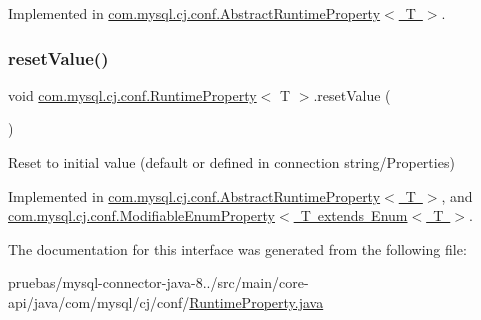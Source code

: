 Implemented in \mbox{\hyperlink{classcom_1_1mysql_1_1cj_1_1conf_1_1_abstract_runtime_property_a2c639b0ccaeee9e568efefe136a0c073}{com.\+mysql.\+cj.\+conf.\+Abstract\+Runtime\+Property$<$ T $>$}}.

\mbox{\label{interfacecom_1_1mysql_1_1cj_1_1conf_1_1_runtime_property_adad737e212723fc3f3da903259377a25}} 
\subsubsection{\texorpdfstring{reset\+Value()}{resetValue()}}
{\footnotesize\ttfamily void \mbox{\hyperlink{interfacecom_1_1mysql_1_1cj_1_1conf_1_1_runtime_property}{com.\+mysql.\+cj.\+conf.\+Runtime\+Property}}$<$ T $>$.reset\+Value (\begin{DoxyParamCaption}{ }\end{DoxyParamCaption})}

Reset to initial value (default or defined in connection string/\+Properties) 

Implemented in \mbox{\hyperlink{classcom_1_1mysql_1_1cj_1_1conf_1_1_abstract_runtime_property_af8d93196b5571652a430ae751df642f9}{com.\+mysql.\+cj.\+conf.\+Abstract\+Runtime\+Property$<$ T $>$}}, and \mbox{\hyperlink{classcom_1_1mysql_1_1cj_1_1conf_1_1_modifiable_enum_property_a45be76d841ee45583b59419fa45526f6}{com.\+mysql.\+cj.\+conf.\+Modifiable\+Enum\+Property$<$ T extends Enum$<$ T $>$}}.



The documentation for this interface was generated from the following file\+:\begin{DoxyCompactItemize}
\item 
pruebas/mysql-\/connector-\/java-\/8../src/main/core-\/api/java/com/mysql/cj/conf/\mbox{\hyperlink{_runtime_property_8java}{Runtime\+Property.\+java}}\end{DoxyCompactItemize}
